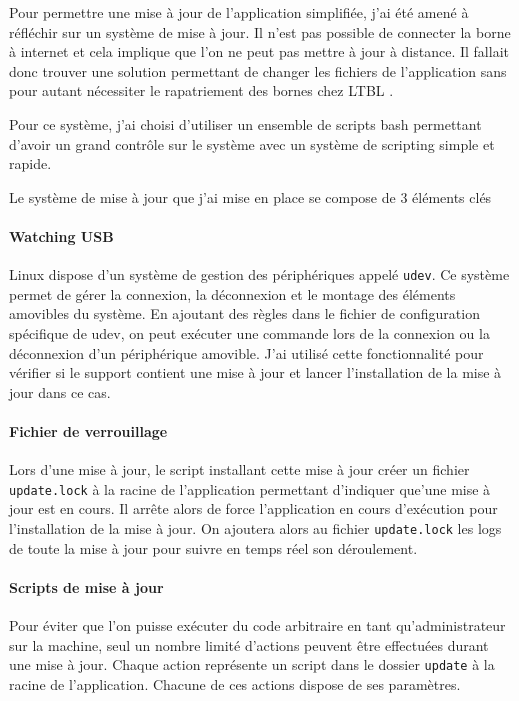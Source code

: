 Pour permettre une mise à jour de l'application simplifiée, j'ai été amené à réfléchir sur un système de mise à jour.
Il n'est pas possible de connecter la borne à internet et cela implique que l'on ne peut pas mettre à jour à distance.
Il fallait donc trouver une solution permettant de changer les fichiers de l'application sans pour autant nécessiter le rapatriement des bornes chez LTBL .

Pour ce système, j'ai choisi d'utiliser un ensemble de scripts bash permettant d'avoir un grand contrôle sur le système avec un système de scripting simple et rapide.

Le système de mise à jour que j'ai mise en place se compose de 3 éléments clés

\paragraph{Watching USB} Linux dispose d'un système de gestion des périphériques appelé \texttt{udev}.
Ce système permet de gérer la connexion, la déconnexion et le montage des éléments amovibles du système.
En ajoutant des règles dans le fichier de configuration spécifique de udev, on peut exécuter une commande lors de la connexion ou la déconnexion d'un périphérique amovible.
J'ai utilisé cette fonctionnalité pour vérifier si le support contient une mise à jour et lancer l'installation de la mise à jour dans ce cas.

\paragraph{Fichier de verrouillage} Lors d'une mise à jour, le script installant cette mise à jour créer un fichier \texttt{update.lock} à la racine de l'application permettant d'indiquer que'une mise à jour est en cours.
Il arrête alors de force l'application en cours d'exécution pour l'installation de la mise à jour.
On ajoutera alors au fichier \texttt{update.lock} les logs de toute la mise à jour pour suivre en temps réel son déroulement.

\paragraph{Scripts de mise à jour} Pour éviter que l'on puisse exécuter du code arbitraire en tant qu'administrateur sur la machine, seul un nombre limité d'actions peuvent être effectuées durant une mise à jour.
Chaque action représente un script dans le dossier \texttt{update} à la racine de l'application.
Chacune de ces actions dispose de ses paramètres.

